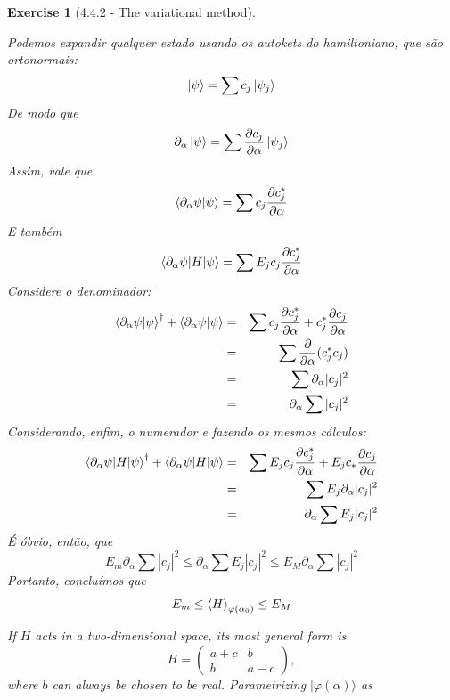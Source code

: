 \documentclass[12pt]{article}
\def\be{\begin{equation}}
\def\ee{\end{equation}}
\def\bea{\begin{eqnarray*}}
\def\eea{\end{eqnarray*}}
\def\f{\frac}
\newtheorem{exercise}{Exercise}
\begin{document}
\begin{exercise}[4.4.2 - The variational method]
\begin{exercises}
\begin{multianswer}
			Podemos expandir qualquer estado usando os autokets do hamiltoniano, que são ortonormais:
			\be
				\ket{\psi} = \sum c_j\ket{\psi_j}
			\ee
			De modo que
			\be
				\partial_\alpha\ket{\psi} = \sum \f{\partial c_j}{\partial\alpha} \ket{\psi_j}
			\ee
			Assim, vale que
			\be
				\braket{\partial_\alpha\psi|\psi} = \sum c_j\f{\partial c_j^*}{\partial\alpha}
			\ee
			E também
			\be
				\braket{\partial_\alpha\psi|H|\psi} = \sum E_jc_j\f{\partial c_j^*}{\partial\alpha}
			\ee
			Considere o denominador:
			\bea
				\braket{\partial_\alpha\psi|\psi}^\dagger + \braket{\partial_\alpha\psi|\psi} 
					&=& \sum c_j \f{\partial c_j^*}{\partial\alpha} + c_j^*\f{\partial c_j}{\partial\alpha} \\
					&=& \sum \f{\partial}{\partial\alpha} (c_j^*c_j) \\
					&=& \sum \partial_\alpha |c_j|^2 \\
					&=& \partial_\alpha \sum |c_j|^2
			\eea
			Considerando, enfim, o numerador e fazendo os mesmos cálculos:
			\bea
				\braket{\partial_\alpha\psi|H|\psi}^\dagger + \braket{\partial_\alpha\psi|H|\psi} 
					&=& \sum E_jc_j\f{\partial c_j^*}{\partial\alpha} + E_j c_* \f{\partial c_j}{\partial\alpha} \\
					&=& \sum E_j \partial_\alpha |c_j|^2 \\
					&=& \partial_\alpha \sum E_j|c_j|^2 
			\eea
			É óbvio, então, que
			\be
				E_m \partial_\alpha\sum |c_j|^2 \leq \partial_\alpha\sum E_j|c_j|^2 \leq E_M \partial_\alpha\sum |c_j|^2
			\ee 
			Portanto, concluímos que
			\be
				E_m \leq \braket{H}_{\varphi(\alpha_0)} \leq E_M
			\ee	
		\end{multianswer}
	
		\item If $H$ acts in a two-dimensional space, its most general form is
		$$
		H=\left(\begin{array}{cc}
			a+c & b \\
			b & a-c
		\end{array}\right),
		$$
		where $b$ can always be chosen to be real. Parametrizing $|\varphi(\alpha)\rangle$ as
		

\end{exercises}
\end{exercise}
\end{document}

